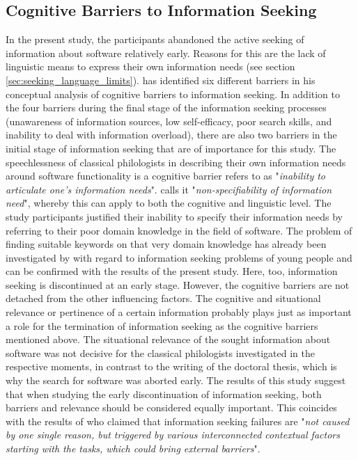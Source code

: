 \documentclass[12pt, a4paper, titlepage, oneside, abstract=true, toc=listof, toc=bibliography, BCOR=1cm]{scrreprt}
\begin{document}
{\subsection*{Cognitive Barriers to Information Seeking}
In the present study, the participants abandoned the active seeking of information about software relatively early. Reasons for this are the lack of linguistic means to express their own information needs (see section \ref{sec:seeking_language_limits}). \citep{Savolainen2015a} has identified six different barriers in his conceptual analysis of cognitive barriers to information seeking. In addition to the four barriers during the final stage of the information seeking processes (unawareness of information sources, low self-efficacy, poor search skills, and inability to deal with information overload), there are also two barriers in the initial stage of information seeking that are of importance for this study. The speechlessness of classical philologists in describing their own information needs around software functionality is a cognitive barrier \citet[p. 616]{Savolainen2015a} refers to as "\textit{inability to articulate one's information needs}". \citet[p. 137]{Belkin1980} calls it "\textit{non-specifiability of information need}", whereby this can apply to both the cognitive and linguistic level. The study participants justified their inability to specify their information needs by referring to their poor domain knowledge \citep[p. 619]{Savolainen2015a} in the field of software. The problem of finding suitable keywords on that very domain knowledge has already been investigated by \citet[p. 285]{Shenton2012} with regard to information seeking problems of young people and can be confirmed with the results of the present study. Here, too, information seeking is discontinued at an early stage. However, the cognitive barriers are not detached from the other influencing factors. The cognitive and situational relevance \citep{Schamber1990} or pertinence \citep{Froehlich1994} of a certain information probably plays just as important a role for the termination of information seeking as the cognitive barriers mentioned above. The situational relevance of the sought information about software was not decisive for the classical philologists investigated in the respective moments, in contrast to the writing of the doctoral thesis, which is why the search for software was aborted early. The results of this study suggest that when studying the early discontinuation of information seeking, both barriers and relevance should be considered equally important. This coincides with the results of \citet[p. 454]{Wang2008} who claimed that information seeking failures are "\textit{not caused by one single reason, but triggered by various interconnected contextual factors starting with the tasks, which could bring external barriers}".  

}
\end{document}
